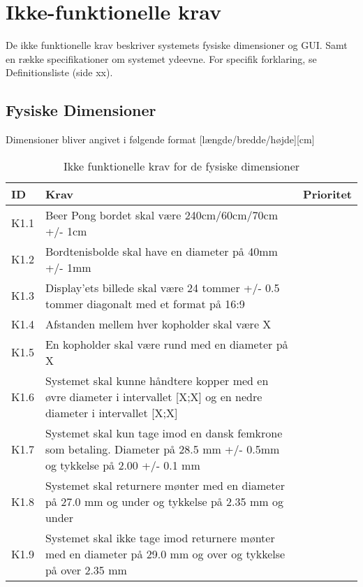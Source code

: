 \documentclass[Kravspecifikation/Kravspec_Main.tex]{subfiles}
\begin{document}
\section{Ikke-funktionelle krav}
De ikke funktionelle krav beskriver systemets fysiske dimensioner og GUI. Samt en række specifikationer om systemet ydeevne. For specifik forklaring, se Definitionsliste (side xx).

\subsection{Fysiske Dimensioner}
Dimensioner bliver angivet i følgende format [længde/bredde/højde][cm]
\begin{table}[H]
\begin{tabular}{|L{0.1\textwidth}|L{0.75\textwidth}|L{0.15\textwidth}|}
\hline
\textbf{ID} & \textbf{Krav} & \textbf{Prioritet} \\ \hline
K1.1 & Beer Pong bordet skal være 240cm/60cm/70cm +/- 1cm  &  \\ \hline
K1.2 & Bordtenisbolde skal have en diameter på 40mm +/- 1mm&  \\ \hline
K1.3 & Display'ets billede skal være 24 tommer +/- 0.5 tommer diagonalt med et format på 16:9&  \\ \hline
K1.4 & Afstanden mellem hver kopholder skal være X & \\ \hline
K1.5 & En kopholder skal være rund med en diameter på X & \\ \hline 
K1.6 & Systemet skal kunne håndtere kopper med en øvre diameter i intervallet [X;X] og en nedre diameter i intervallet [X;X] & \\ \hline
K1.7 & Systemet skal kun tage imod en dansk femkrone som betaling. Diameter på 28.5 mm +/- 0.5mm og tykkelse på 2.00 +/- 0.1 mm & \\ \hline
K1.8 & Systemet skal returnere mønter med en diameter på 27.0 mm og under og tykkelse på 2.35 mm og under & \\ \hline
K1.9 & Systemet skal ikke tage imod returnere mønter med en diameter på 29.0 mm og over og tykkelse på over 2.35 mm& \\ \hline
\end{tabular}
\caption{Ikke funktionelle krav for de fysiske dimensioner}
\label{tab:fysiske_dimensioner}
\end{table}
\end{document}
